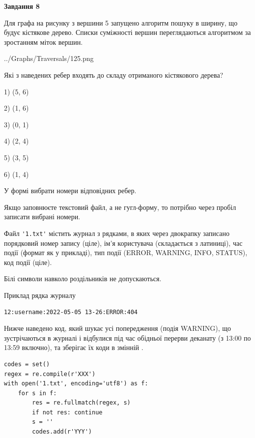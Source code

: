 \documentclass[12pt, ukrainian]{article}
\def\code#1{\Verb!#1!}
\begin{document}
{\begin {large}
{\begin {center}\textbf{Завдання 8}\end {center}}\par
Для графа на рисунку з вершини 5 запущено алгоритм пошуку в ширину, що будує кістякове дерево. Списки суміжності вершин переглядаються алгоритмом за зростанням міток вершин.\par
\begin{center}
	{../Graphs/Traversals/125.png}
\end{center}
\par Які з наведених ребер входять до складу отриманого кістякового дерева?\par
1) (5, 6)\par
2) (1, 6)\par
3) (0, 1)\par
4) (2, 4)\par
5) (3, 5)\par
6) (1, 4)\par
{\vskip 15pt} У формі вибрати номери відповідних ребер.


Якщо заповнюєте текстовий файл, а не гугл-форму, то потрібно через пробіл записа\-ти вибрані номери.\par
\newpage


Файл \code{'1.txt'} містить журнал з рядками, в яких через двокрапку записано поряд\-ко\-вий номер запису (ціле), ім'я користувача (складається з латиниці), час події (фор\-мат як у прикладі), тип події (ERROR, WARNING, INFO, STATUS), код події (ціле).

Білі символи навколо роздільників не допускаються.

Приклад рядка журналу



\begin{verbatim}
12:username:2022-05-05 13-26:ERROR:404
\end{verbatim}


Нижче наведено код, який шукає усі попередження (подія WARNING), що зустрі\-ча\-ються в журналі і відбулися під час обідньої перерви деканату (з 13:00 по 13:59 включно), та зберігає їх коди в змінній .



\begin{verbatim}
codes = set()
regex = re.compile(r'XXX')
with open('1.txt', encoding='utf8') as f:
    for s in f:
        res = re.fullmatch(regex, s)
        if not res: continue
        s = ''
        codes.add(r'YYY')
\end{verbatim}





\end{large}}
\end{document}
